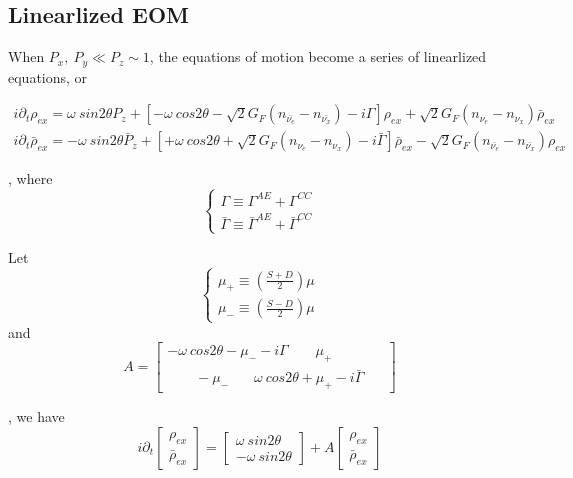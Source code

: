 \documentclass[aps,prd,twocolumn,amsmath,amssymb,groupedaddress]{revtex4-2}
\begin{document}
\subsection{\label{subsec:linear} Linearlized EOM}
When $P_x, ~P_y \ll P_z \sim 1$, the equations of motion become a series of linearlized equations, or

\begin{widetext}
\begin{eqnarray}
	i \partial_t \rho_{ex} = \omega ~sin2\theta P_{z}
	+\left[-\omega ~cos2\theta-\sqrt{2}G_F(n_{\bar{\nu_e}}-n_{\bar{\nu_x}})- i \Gamma \right]\rho_{ex} + \sqrt{2}G_F(n_{\nu_e}-n_{\nu_x}) \bar{\rho}_{ex}\\
	i \partial_t \bar{\rho}_{ex} = - \omega ~sin2\theta \bar{P}_{z} +\left[+\omega ~cos2\theta + \sqrt{2}G_F(n_{\nu_e}-n_{\nu_x}) - i \bar{\Gamma} \right]\bar{\rho}_{ex} -\sqrt{2}G_F(n_{\bar{\nu_e}}-n_{\bar{\nu_x}}) \rho_{ex}
\end{eqnarray}
\end{widetext}
,
where
\begin{equation}
\begin{cases}
	\Gamma \equiv \Gamma^{AE} + \Gamma^{CC}
	\\
	\bar{\Gamma} \equiv \bar{\Gamma}^{AE} + \bar{\Gamma}^{CC}
\end{cases}
\end{equation}

Let
\begin{equation}
\begin{cases}
	\mu_+ \equiv \left(\frac{S+D}{2}\right) \mu
	\\
	\mu_- \equiv \left(\frac{S-D}{2}\right) \mu
\end{cases}
\end{equation}
and
\begin{equation}
A = \begin{bmatrix}
	-\omega ~cos2\theta-\mu_--i\Gamma ~~~~~~~~~ \mu_+ ~~~~~~~~~~~~~~~~\\ ~~~~~~~~~ -\mu_- ~~~~~~~~ \omega ~cos2\theta+\mu_+-i\bar{\Gamma}
\end{bmatrix}
\end{equation}

, we have
\begin{equation}
	\label{equ:EOM_matrix}
	i \partial_t \begin{bmatrix}
		\rho_{ex} \\ \bar{\rho}_{ex}
	\end{bmatrix} =
	\begin{bmatrix}
		\omega ~sin2\theta \\ - \omega ~sin2\theta
	\end{bmatrix} + A \begin{bmatrix}
		\rho_{ex} \\ \bar{\rho}_{ex}
	\end{bmatrix}
\end{equation}
\end{document}
